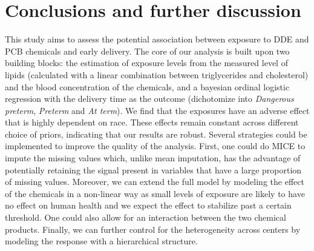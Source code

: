 \documentclass[10pt]{jmlr}%
\begin{document}
\section{Conclusions and further discussion}
\label{sec:conclusion}
This study aims to assess the potential association between exposure to DDE and PCB chemicals and early delivery. The core of our analysis is built upon two building blocks: the estimation of exposure levels from the measured level of lipids (calculated with a linear combination between triglycerides and cholesterol) and the blood concentration of the chemicals, and a bayesian ordinal logistic regression with the delivery time as the outcome (dichotomize into \textit{Dangerous preterm}, \textit{Preterm} and \textit{At term}). We find that the exposures have an adverse  effect that is highly dependent on race. These effects remain constant across different choice of priors, indicating that our results are robust. Several strategies could be implemented to improve the quality of the analysis. First, one could do MICE to impute the missing values which, unlike mean imputation, has the advantage of potentially retaining the signal present in variables that have a large proportion of missing values. Moreover, we can extend the full model by modeling the effect of the chemicals in a non-linear way as small levels of exposure are likely to have no effect on human health and we expect the effect to stabilize past a certain threshold. One could also allow for an interaction between the two chemical products. Finally, we can further control for the heterogeneity across centers by modeling the response with a hierarchical structure.
\end{document}
